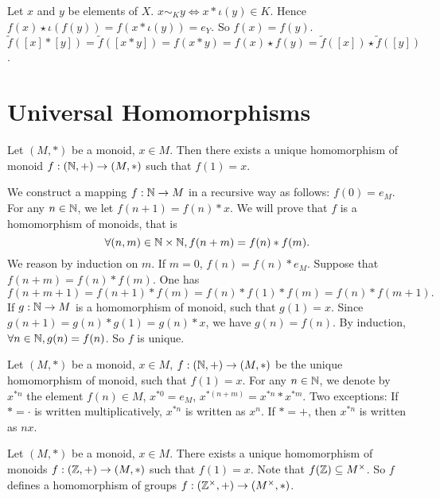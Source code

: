 \documentclass{book}
\numberwithin{equation}{section}
\begin{document}
\begin{proofenv}
    Let $x$ and $y$ be elements of $X$. $x\sim_K y\Leftrightarrow x*\iota(y)\in K$. Hence $f(x)\star \iota(f(y))=f(x*\iota(y))=e_Y$. So $f(x)=f(y)$. $\tilde{f}([x]*[y])=\tilde{f}([x*y])=f(x*y)=f(x)\star f(y)=\tilde{f}([x])\star \tilde{f}([y])$.
\end{proofenv}

\section{Universal Homomorphisms}
\begin{propositionenv}
    Let $(M,*)$ be a monoid, $x\in M$. Then there exists a unique homomorphism of monoid $f:(\mathbb{N},+)\rightarrow (M,*)$ such that $f(1)=x$.
\end{propositionenv}
\begin{proofenv}
    We construct a mapping $f:\mathbb{N}\rightarrow M$ in a recursive way as follows: $f(0)=e_M$. For any $n\in \mathbb{N}$, we let $f(n+1)=f(n)*x$. We will prove that $f$ is a homomorphism of monoids, that is 
    $$\forall (n,m)\in \mathbb{N}\times \mathbb{N},f(n+m)=f(n)*f(m).$$
    We reason by induction on $m$. If $m=0$, $f(n)=f(n)*e_M$. Suppose that $f(n+m)=f(n)*f(m)$. One has $$f(n+m+1)=f(n+1)*f(m)=f(n)*f(1)*f(m)=f(n)*f(m+1).$$
    If $g:\mathbb{N}\rightarrow M$ is a homomorphism of monoid, such that $g(1)=x$. Since $g(n+1)=g(n)*g(1)=g(n)*x$, we have $g(n)=f(n)$. By induction, $\forall n\in \mathbb{N},g(n)=f(n)$. So $f$ is unique.
\end{proofenv}
\begin{notationenv}
    Let $(M,*)$ be a monoid, $x\in M$, $f:(\mathbb{N},+)\rightarrow (M,*)$ be the unique homomorphism of monoid, such that $f(1)=x$. For any $n\in \mathbb{N}$, we denote by $x^{*n}$ the element $f(n)\in M$, $x^{*0}=e_M$, $x^{*(n+m)}=x^{*n}*x^{*m}$.
    \newline
    Two exceptions: If $*=\cdot$ is written multiplicatively, $x^{*n}$ is written as $x^n$. If $*=+$, then $x^{*n}$ is written as $nx$. 
\end{notationenv}
\begin{propositionenv}
    Let $(M,*)$ be a monoid, $x\in M$. There exists a unique homomorphism of monoids $f:(\mathbb{Z},+)\rightarrow (M,*)$ such that $f(1)=x$. Note that  $f(\mathbb{Z})\subseteq M^\times$. So $f$ defines a homomorphism of groups $f:(\mathbb{Z}^\times,+)\rightarrow (M^\times,*)$.
\end{propositionenv}
\end{document}
